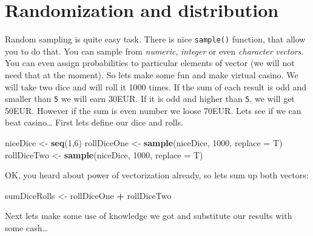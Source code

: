 \documentclass[]{book}
\newenvironment{Shaded}{\begin{snugshade}}{\end{snugshade}}
\newcommand{\KeywordTok}[1]{\textcolor[rgb]{0.13,0.29,0.53}{\textbf{#1}}}
\newcommand{\DataTypeTok}[1]{\textcolor[rgb]{0.13,0.29,0.53}{#1}}
\newcommand{\DecValTok}[1]{\textcolor[rgb]{0.00,0.00,0.81}{#1}}
\newcommand{\StringTok}[1]{\textcolor[rgb]{0.31,0.60,0.02}{#1}}
\newcommand{\OperatorTok}[1]{\textcolor[rgb]{0.81,0.36,0.00}{\textbf{#1}}}
\newcommand{\NormalTok}[1]{#1}
\theoremstyle{definition}
\theoremstyle{definition}
\theoremstyle{definition}
\theoremstyle{remark}
\begin{document}
\section{Randomization and
distribution}\label{randomization-and-distribution}

Random sampling is quite easy task. There is nice \texttt{sample()}
function, that allow you to do that. You can sample from \emph{numeric},
\emph{integer} or even \emph{character} \emph{vectors}. You can even
assign probabilities to particular elements of vector (we will not need
that at the moment). So lets make some fun and make virtual casino. We
will take two dice and will roll it 1000 times. If the sum of each
result is odd and smaller than \texttt{5} we will earn 30EUR. If it is
odd and higher than \texttt{5}, we will get 50EUR. However if the sum is
even number we loose 70EUR. Lets see if we can beat casino\ldots{} First
lets define our dice and rolls.

\begin{Shaded}
\begin{Highlighting}[]
\NormalTok{niceDice <-}\StringTok{ }\KeywordTok{seq}\NormalTok{(}\DecValTok{1}\NormalTok{,}\DecValTok{6}\NormalTok{)}
\NormalTok{rollDiceOne <-}\StringTok{ }\KeywordTok{sample}\NormalTok{(niceDice, }\DecValTok{1000}\NormalTok{, }\DataTypeTok{replace =}\NormalTok{ T)}
\NormalTok{rollDiceTwo <-}\StringTok{ }\KeywordTok{sample}\NormalTok{(niceDice, }\DecValTok{1000}\NormalTok{, }\DataTypeTok{replace =}\NormalTok{ T)}
\end{Highlighting}
\end{Shaded}

OK, you heard about power of vectorization already, so lets sum up both
vectors:

\begin{Shaded}
\begin{Highlighting}[]
\NormalTok{sumDiceRolls <-}\StringTok{ }\NormalTok{rollDiceOne }\OperatorTok{+}\StringTok{ }\NormalTok{rollDiceTwo}
\end{Highlighting}
\end{Shaded}

Next lets make some use of knowledge we got and substitute our results
with some cash\ldots{}
\end{document}
